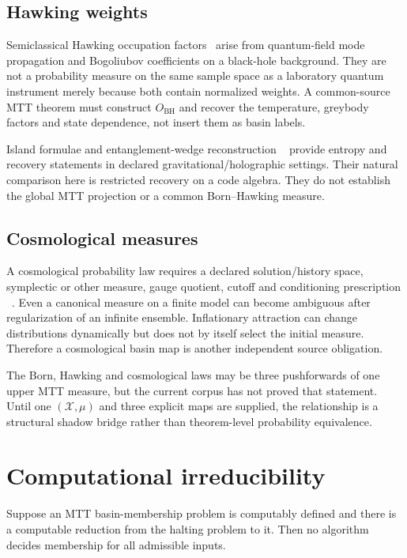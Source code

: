 \documentclass[11pt]{article}
\newcommand{\cX}{\mathcal X}
\begin{document}
\subsection{Hawking weights}

Semiclassical Hawking occupation factors~\cite{Hawking1975} arise from quantum-field mode propagation
and Bogoliubov coefficients on a black-hole background. They are not a probability
measure on the same sample space as a laboratory quantum instrument merely because
both contain normalized weights. A common-source MTT theorem must construct
$O_{\mathrm{BH}}$ and recover the temperature, greybody factors and state dependence,
not insert them as basin labels.

Island formulae and entanglement-wedge reconstruction
~\cite{Penington2019,AEMM2019} provide entropy and recovery
statements in declared gravitational/holographic settings. Their natural comparison
here is restricted recovery on a code algebra. They do not establish the global MTT
projection or a common Born--Hawking measure.

\subsection{Cosmological measures}

A cosmological probability law requires a declared solution/history space, symplectic
or other measure, gauge quotient, cutoff and conditioning prescription
~\cite{GHS1987}. Even a
canonical measure on a finite model can become ambiguous after regularization of an
infinite ensemble. Inflationary attraction can change distributions dynamically but
does not by itself select the initial measure. Therefore a cosmological basin map is
another independent source obligation.

\begin{corollary}
The Born, Hawking and cosmological laws may be three pushforwards of one upper MTT
measure, but the current corpus has not proved that statement. Until one
$(\cX,\mu)$ and three explicit maps are supplied, the relationship is a structural
shadow bridge rather than theorem-level probability equivalence.
\end{corollary}

\section{Computational irreducibility}

\begin{proposition}\label{prop:undecidable}
Suppose an MTT basin-membership problem is computably defined and there is a
computable reduction from the halting problem to it. Then no algorithm decides
membership for all admissible inputs.
\end{proposition}
\end{document}
